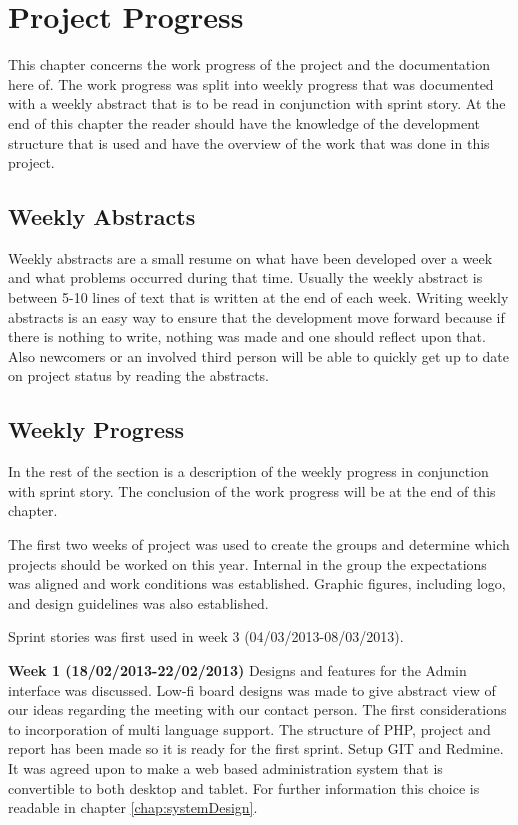 \chapter{Project Progress}
\label{sec:projectProgress}
This chapter concerns the work progress of the project and the documentation here of. 
The work progress was split into weekly progress that was documented with a weekly abstract that is to be read in conjunction with sprint story.  
At the end of this chapter the reader should have the knowledge of the development structure that is used and have the overview of the work that was done in this project. 


\section{Weekly Abstracts}      
\label{subsec:weeklyAbstracts}
Weekly abstracts are a small resume on what have been developed over a week and what problems occurred during that time. 
Usually the weekly abstract is between 5-10 lines of text that is written at the end of each week. 
Writing weekly abstracts is an easy way to ensure that the development move forward because if there is nothing to write, nothing was made and one should reflect upon that.
Also newcomers or an involved third person will be able to quickly get up to date on project status by reading the abstracts.         

\section{Weekly Progress}
\label{subsec:weeklyProgress}
In the rest of the section is a description of the weekly progress in conjunction with sprint story.
The conclusion of the work progress will be at the end of this chapter. 

The first two weeks of project was used to create the groups and determine which projects should be worked on this year.  
Internal in the group the expectations was aligned and work conditions was established.
Graphic figures, including logo, and design guidelines was also established.      

Sprint stories was first used in week 3 (04/03/2013-08/03/2013).   

\textbf{Week 1 (18/02/2013-22/02/2013)} 
Designs and features for the Admin interface was discussed.
Low-fi board designs was made to give abstract view of our ideas regarding the meeting with our contact person.   
The first considerations to incorporation of multi language support.
The structure of PHP, project and report has been made so it is ready for the first sprint.
Setup GIT and Redmine.
It was agreed upon to make a web based administration system that is convertible to both desktop and tablet.  
For further information this choice is readable in chapter \vref{chap:systemDesign}.

